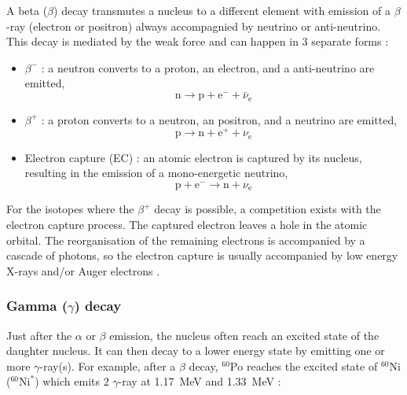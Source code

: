\documentclass[main.tex]{subfiles}
\begin{document}
\NI A beta ($\beta$) decay transmutes a nucleus to a different element with emission of a $\beta$-ray (electron or positron) always accompagnied by neutrino or anti-neutrino. This decay is mediated by the weak force and can happen in 3 separate forms :


\begin{itemize}

\item $\beta^-$ : a neutron converts to a proton, an electron, and a anti-neutrino are emitted, 
\begin{equation}
\text{n} \rightarrow \text{p} + \text{e}^- + \bar{\nu}_\text{e}
\end{equation} 


\item $\beta^+$ : a proton converts to a neutron, an positron, and a neutrino are emitted, 
\begin{equation}
\text{p} \rightarrow \text{n} + \text{e}^+ + \nu_\text{e}
\end{equation} 


\item Electron capture (EC) : an atomic electron is captured by its nucleus, resulting in the emission of a mono-energetic neutrino,
\begin{equation}
\text{p} + \text{e}^- \rightarrow \text{n} + \nu_{\text{e}}
\end{equation}  

\end{itemize}


\bigskip


\NI For the isotopes where the $\beta^+$ decay is possible, a competition exists with the electron capture process. The captured electron leaves a hole in the atomic orbital. The reorganisation of the remaining electrons is accompanied by a cascade of photons, so the electron capture is usually accompanied by low energy X-rays and/or Auger electrons .

 
\subsubsection{Gamma ($\gamma$) decay}


\NI Just after the $\alpha$ or $\beta$ emission, the nucleus often reach an excited state of the daughter nucleus. It can then decay to a lower energy state by emitting one or more $\gamma$-ray(s). For example, after a $\beta$ decay, $^{\text{60}}\text{Po}$ reaches the excited state of $^{\text{60}}\text{Ni}$ ($^{\text{60}}\text{Ni}^\ast$) which emits 2 $\gamma$-ray at 1.17~MeV and 1.33~MeV : 
\end{document}
